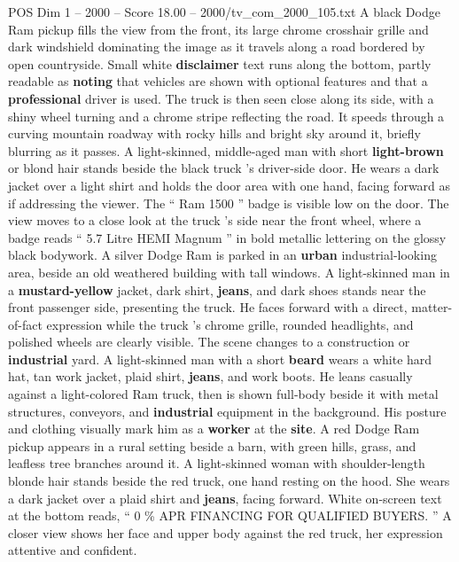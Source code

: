 \begin{textsample}{POS Dim 1 – 2000 – Score 18.00 – 2000/tv\_com\_2000\_105.txt}  \label{ex:f1_pos_034}
A black Dodge Ram pickup fills the view from the front, its large chrome crosshair grille and dark windshield dominating the image as it travels along a road bordered by open countryside.
Small white \textbf{disclaimer} text runs along the bottom, partly readable as \textbf{noting} that vehicles are shown with optional features and that a \textbf{professional} driver is used.
The truck is then seen close along its side, with a shiny wheel turning and a chrome stripe reflecting the road.
It speeds through a curving mountain roadway with rocky hills and bright sky around it, briefly blurring as it passes.
A light-skinned, middle-aged man with short \textbf{light-brown} or blond hair stands beside the black truck ’s driver-side door.
He wears a dark jacket over a light shirt and holds the door area with one hand, facing forward as if addressing the viewer.
The “ Ram 1500 ” badge is visible low on the door.
The view moves to a close look at the truck ’s side near the front wheel, where a badge reads “ 5.7 Litre HEMI Magnum ” in bold metallic lettering on the glossy black bodywork.
A silver Dodge Ram is parked in an \textbf{urban} industrial-looking area, beside an old weathered building with tall windows.
A light-skinned man in a \textbf{mustard-yellow} jacket, dark shirt, \textbf{jeans}, and dark shoes stands near the front passenger side, presenting the truck.
He faces forward with a direct, matter-of-fact expression while the truck ’s chrome grille, rounded headlights, and polished wheels are clearly visible.
The scene changes to a construction or \textbf{industrial} yard.
A light-skinned man with a short \textbf{beard} wears a white hard hat, tan work jacket, plaid shirt, \textbf{jeans}, and work boots.
He leans casually against a light-colored Ram truck, then is shown full-body beside it with metal structures, conveyors, and \textbf{industrial} equipment in the background.
His posture and clothing visually mark him as a \textbf{worker} at the \textbf{site}.
A red Dodge Ram pickup appears in a rural setting beside a barn, with green hills, grass, and leafless tree branches around it.
A light-skinned woman with shoulder-length blonde hair stands beside the red truck, one hand resting on the hood.
She wears a dark jacket over a plaid shirt and \textbf{jeans}, facing forward.
White on-screen text at the bottom reads, “ 0 \% APR FINANCING FOR QUALIFIED BUYERS. ” A closer view shows her face and upper body against the red truck, her expression attentive and confident.

\end{textsample}

